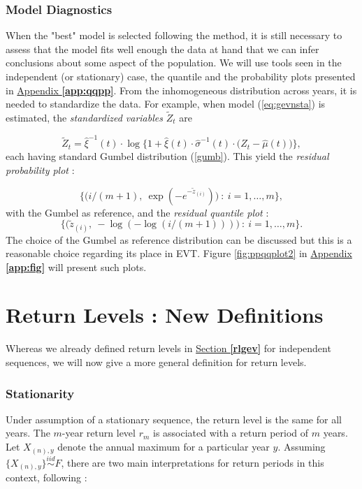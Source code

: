 \subsubsection*{Model Diagnostics}


When the "best" model is selected following the method, it is still necessary to assess that the model fits well enough the data at hand that we can infer conclusions about some aspect of the population. 
We will use tools seen in the independent (or stationary) case, the quantile and the probability plots presented in \hyperref[app:qqpp]{Appendix \textbf{\ref{app:qqpp}}}. From the inhomogeneous distribution across years, it is needed to standardize the data. For example, when model (\ref{eq:gevnsta}) is estimated, the \emph{standardized variables} $\tilde{Z}_t$ are 

\begin{equation}
\tilde{Z}_t=\hat{\xi}^{-1}(t)\cdot\log \bigg\{1+\hat{\xi}(t)\cdot \hat{\sigma}^{-1}(t)\cdot\Big(Z_t-\hat{\mu}(t)\Big)\bigg\},
\end{equation}
each having standard Gumbel distribution (\ref{gumb}). This yield the \emph{residual probability plot} :

\begin{equation}
\bigg\{\Big(i/(m+1),\  \exp(-e^{-\tilde{z}_{(i)}})\Big) \ : \ i=1,\dots,m\bigg\},
\end{equation}
with the Gumbel as reference, and the \emph{residual quantile plot} :
\begin{equation}
\bigg\{\Big(\tilde{z}_{(i)},\ -\log(-\log(i/(m+1)))\Big) \ : \ i=1,\dots,m\bigg\}.
\end{equation}
The choice of the Gumbel as reference distribution can be discussed but this is a reasonable choice regarding its place in EVT.
Figure \ref{fig:ppqqplot2} in \hyperref[app:fig]{Appendix \textbf{\ref{app:fig}}} will present such plots.


\section{Return Levels : New Definitions}\label{sec:returnlvlnstatio}

Whereas we already defined return levels in \hyperref[rlgev]{Section  \textbf{\ref{rlgev}}} for independent sequences, we will now give a more general definition for return levels. 

\subsubsection*{Stationarity} 
Under assumption of a
stationary sequence, the return level is the same for all years. The $m$-year return level $r_m$ is associated with a return period of $m$ years. Let $X_{(n),y}$ denote the annual maximum for a particular year $y$. Assuming $\{X_{(n),y}\}\stackrel{iid}{\sim}F$, there are two main interpretations for return periods in this context, following \citet[chap.4]{ag_extremes_2013} :

